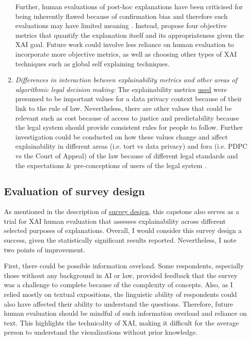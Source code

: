 \begin{enumerate}[listparindent=0.5cm]
    Further, human evaluations of post-hoc explanations have been criticised for being inherently flawed because of confirmation bias and therefore such evaluations may have limited meaning \cite{rosenfeld2021}. Instead, \cite{rosenfeld2021} propose four objective metrics that quantify the explanation itself and its appropriateness given the XAI goal. Future work could involve less reliance on human evaluation to incorporate more objective metrics, as well as choosing other types of XAI techniques such as global self explaining techniques. 

    \item \textit{Differences in interaction between explainability metrics and other areas of algorithmic legal decision making:} The explainability metrics \hyperref[sec:three_contexts_comparison]{used} were presumed to be important values for a data privacy context because of their link to the rule of law. Nevertheless, there are other values that could be relevant such as cost because of access to justice and predictability because the legal system should provide consistent rules for people to follow. Further investigation could be conducted on how these values change and affect explainability in different areas (i.e. tort vs data privacy) and fora (i.e. PDPC vs the Court of Appeal) of the law because of different legal standards \cite{hacker2022varieties} and the expectations \& pre-conceptions of users of the legal system \cite{yalcin2022perceptions}.
\end{enumerate}

\subsection{Evaluation of survey design}
As mentioned in the description of \hyperref[sec:survey_method]{survey design}, this capstone also serves as a trial for XAI human evaluation that assesses explainability across different selected purposes of explanations. Overall, I would consider this survey design a success, given the statistically significant results reported. Nevertheless, I note two points of improvement.

First, there could be possible information overload. Some respondents, especially those without any background in AI or law, provided feedback that the survey was a challenge to complete because of the complexity of concepts. Also, as I relied mostly on textual expositions, the linguistic ability of respondents could also have affected their ability to understand the questions. Therefore, future human evaluation should be mindful of such information overload and reliance on text. This highlights the technicality of XAI, making it difficult for the average person to understand the visualizations without prior knowledge.
    
